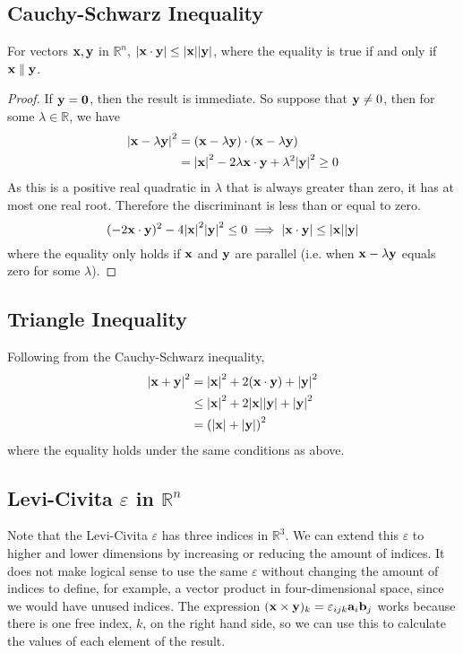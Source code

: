 \subsection{Cauchy-Schwarz Inequality}
\begin{proposition}
	For vectors $\vb x, \vb y$ in $\mathbb R^n$, $\abs{\vb x \cdot \vb y} \leq \abs{\vb x} \abs{\vb y}$, where the equality is true if and only if $\vb x \parallel \vb y$.
\end{proposition}
\begin{proof}
	If $\vb y = \vb 0$, then the result is immediate. So suppose that $\vb y \neq 0$, then for some $\lambda \in \mathbb R$, we have
	\begin{align*}
		\abs{\vb x - \lambda \vb y}^2 & =
		(\vb x - \lambda \vb y) \cdot (\vb x - \lambda \vb y)                                                          \\
		                              & = \abs{\vb x}^2 - 2 \lambda \vb x \cdot \vb y + \lambda^2 \abs{\vb y}^2 \geq 0
	\end{align*}
	As this is a positive real quadratic in $\lambda$ that is always greater than zero, it has at most one real root. Therefore the discriminant is less than or equal to zero.
	\[ (-2 \vb x \cdot \vb y)^2 - 4 \abs{\vb x}^2\abs{\vb y}^2 \leq 0
		\implies \abs{\vb x \cdot \vb y} \leq \abs{\vb x}\abs{\vb y} \]
	where the equality only holds if $\vb x$ and $\vb y$ are parallel (i.e. when $\vb x - \lambda \vb y$ equals zero for some $\lambda$).
\end{proof}

\subsection{Triangle Inequality}
Following from the Cauchy-Schwarz inequality,
\begin{align*}
	\abs{\vb x + \vb y}^2
	 & = \abs{\vb x}^2 + 2(\vb x \cdot \vb y) + \abs{\vb y}^2        \\
	 & \leq \abs{\vb x}^2 + 2 \abs{\vb x}\abs{\vb y} + \abs{\vb y}^2 \\
	 & = \left(\abs{\vb x} + \abs{\vb y}\right)^2
\end{align*}
where the equality holds under the same conditions as above.

\subsection{Levi-Civita $\varepsilon$ in $\mathbb R^n$}
Note that the Levi-Civita $\varepsilon$ has three indices in $\mathbb R^3$. We can extend this $\varepsilon$ to higher and lower dimensions by increasing or reducing the amount of indices. It does not make logical sense to use the same $\varepsilon$ without changing the amount of indices to define, for example, a vector product in four-dimensional space, since we would have unused indices. The expression $(\vb x \times \vb y)_k = \varepsilon_{ijk} \vb a_i \vb b_j$ works because there is one free index, $k$, on the right hand side, so we can use this to calculate the values of each element of the result.

